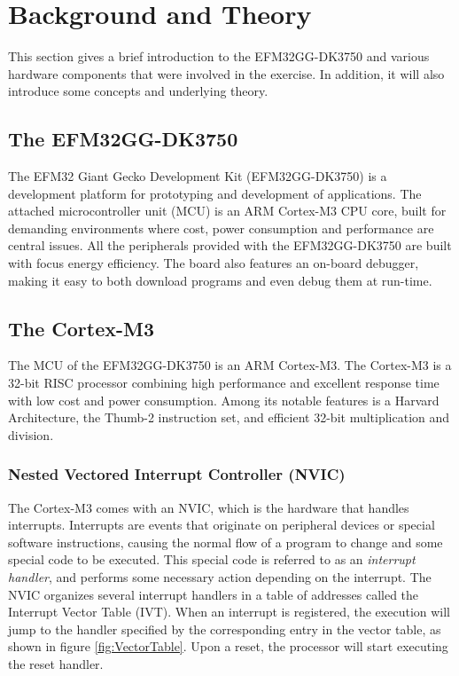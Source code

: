 
\chapter{Background and Theory}
This section gives a brief introduction to the EFM32GG-DK3750 and various hardware components that were involved in the exercise. In addition, it will also introduce some concepts and underlying theory.

\section{The EFM32GG-DK3750}
The EFM32 Giant Gecko Development Kit (EFM32GG-DK3750) is a development platform for prototyping and development of applications. The attached microcontroller unit (MCU) is an ARM Cortex-M3 CPU core, built for demanding environments where cost, power consumption and performance are central issues. All the peripherals provided with the EFM32GG-DK3750 are built with focus energy efficiency. The board also features an on-board debugger, making it easy to both download programs and even debug them at run-time.

\section{The Cortex-M3}
The MCU of the EFM32GG-DK3750 is an ARM Cortex-M3. The Cortex-M3 is a 32-bit RISC processor combining high performance and excellent response time with low cost and power consumption. Among its notable features is a Harvard Architecture, the Thumb-2 instruction set, and efficient 32-bit multiplication and division.


\subsection{Nested Vectored Interrupt Controller (NVIC)}
The Cortex-M3 comes with an NVIC, which is the hardware that handles interrupts. Interrupts are events that originate on peripheral devices or special software instructions, causing the normal flow of a program to change and some special code to be executed. This special code is referred to as an \emph{interrupt handler}, and performs some necessary action depending on the interrupt. The NVIC organizes several interrupt handlers in a table of addresses called the Interrupt Vector Table (IVT). When an interrupt is registered, the execution will jump to the handler specified by the corresponding entry in the vector table, as shown in figure \ref{fig:VectorTable}. Upon a reset, the processor will start executing the reset handler.

